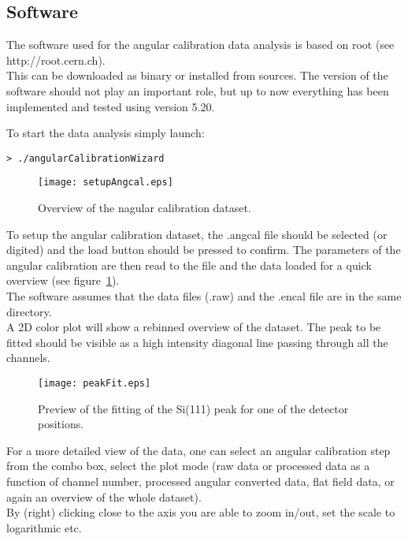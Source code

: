 \subsection{Software}

The software used for the angular calibration data analysis is based on root (see http://root.cern.ch).\\
This can be downloaded as binary or installed from sources. The version of the software should not play an important role, but up to now everything has been implemented and tested using version 5.20.

To start the data analysis simply launch:
\begin{verbatim}
> ./angularCalibrationWizard 
\end{verbatim}

\begin{figure}
\caption{Overview of the nagular calibration dataset.} \label{fig:setangcal}
\texttt{[image: setupAngcal.eps]}
\end{figure} 

To setup the angular calibration dataset, the .angcal file should be selected (or digited) and the load button should be pressed to confirm. The parameters of the angular calibration are then read to the file and the data loaded for a quick overview (see figure~\ref{fig:setangcal}).\\
The software assumes that the data files (.raw) and the .encal file are in the same directory.\\
A 2D color plot will show a rebinned overview of the dataset. The peak to be fitted should be visible as a high intensity diagonal line passing through all the channels.


\begin{figure}
\caption{Preview of the fitting of the Si(111) peak for one of the detector positions.} \label{fig:peakfit}
\texttt{[image: peakFit.eps]}
\end{figure} 

For a more detailed view of the data, one can select an angular calibration step from the combo box, select the plot mode (raw data or processed data as a function of channel number, processed angular converted data, flat field data, or again an overview of the whole dataset). \\
By (right) clicking close to the axis you are able to zoom in/out, set the scale to logarithmic etc.\\

